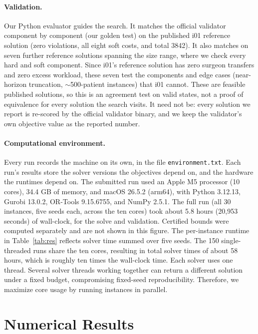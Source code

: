 \documentclass[11pt]{article}
\begin{document}
	\paragraph{Validation.}
	Our Python evaluator guides the search. It matches the official validator component by component (our golden test) on the published i01 reference solution (zero violations, all eight soft costs, and total 3842). It also matches on seven further reference solutions spanning the size range, where we check every hard and soft component. Since i01's reference solution has zero surgeon transfers and zero excess workload, these seven test the components and edge cases (near-horizon truncation, $\sim$500-patient instances) that i01 cannot. These are feasible published solutions, so this is an agreement test on valid states, not a proof of equivalence for every solution the search visits. It need not be: every solution we report is re-scored by the official validator binary, and we keep the validator's own objective value as the reported number.
	
	\paragraph{Computational environment.}
	Every run records the machine on its own, in the file \texttt{environment.txt}. Each run's results store the solver versions the objectives depend on, and the hardware the runtimes depend on. The submitted run
	used an Apple M5 processor (10 cores), 34.4 GB of memory, and macOS 26.5.2 (arm64), with Python
	3.12.13, Gurobi 13.0.2, OR-Tools 9.15.6755, and NumPy 2.5.1. The full run (all 30 instances, five seeds each, across the ten cores) took about 5.8 hours (20{,}953 seconds) of wall-clock, for the solve and validation. Certified bounds were computed separately and are not shown in this figure. The per-instance runtime in Table~\ref{tab:res} reflects solver time summed over five seeds. The 150 single-threaded runs share the ten cores, resulting in total solver times of about 58 hours, which is roughly ten times the wall-clock time. Each solver uses one thread. Several solver threads working together can return a different solution under a fixed budget, compromising fixed-seed reproducibility. Therefore, we maximize core usage by running instances in parallel.
	
	\section{Numerical Results}\label{sec:results}
\end{document}
